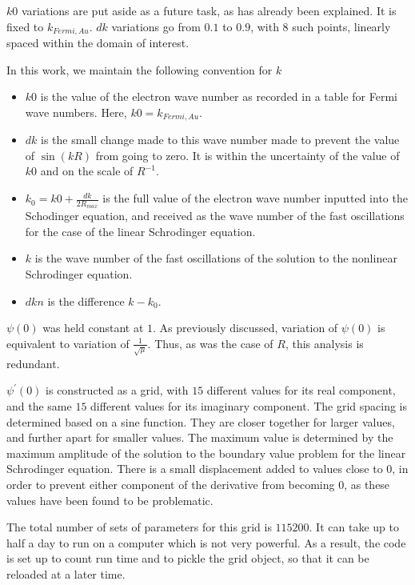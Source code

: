 \documentclass[A4,12pt,oneside]{article}
\renewcommand{\(}{\left(}
\renewcommand{\)}{\right)}
\begin{document}
$k0$ variations are put aside as a future task, as has already been explained. It is fixed to $k_{Fermi, Au}$. $dk$ variations go from $0.1$ to $0.9$, with $8$ such points, linearly spaced within the domain of interest. 

In this work, we maintain the following convention for $k$ 
\begin{itemize}
\item $k0$ is the value of the electron wave number as recorded in a table for Fermi wave numbers. Here, $k0 = k_{Fermi, Au}$.
\item $dk$ is the small change made to this wave number made to prevent the value of $\sin\left(kR\right)$ from going to zero. It is within the uncertainty of the value of $k0$ and on the scale of $R^{-1}$. 
\item $k_0 = k0 + \frac{dk}{2 R_{max}}$ is the full value of the electron wave number inputted into the Schodinger equation, and received as the wave number of the fast oscillations for the case of the linear Schrodinger equation. 
\item $k$ is the wave number of the fast oscillations of the solution to the nonlinear Schrodinger equation. 
\item $dkn$ is the difference $k - k_0$. 
\end{itemize}

$\psi\left(0\right)$ was held constant at $1$. As previously discussed, variation of $\psi\left(0\right)$ is equivalent to variation of $\frac{1}{\sqrt{\mu}}$. Thus, as was the case of $R$, this analysis is redundant.

$\psi^\prime\left(0\right)$ is constructed as a grid, with $15$ different values for its real component, and the same $15$ different values for its imaginary component. The grid spacing is determined based on a sine function. They are closer together for larger values, and further apart for smaller values. The maximum value is determined by the maximum amplitude of the solution to the boundary value problem for the linear Schrodinger equation. There is a small displacement added to values close to $0$, in order to prevent either component of the derivative from becoming $0$, as these values have been found to be problematic.

The total number of sets of parameters for this grid is $115200$. It can take up to half a day to run on a computer which is not very powerful. As a result, the code is set up to count run time and to pickle the grid object, so that it can be reloaded at a later time.
\end{document}
